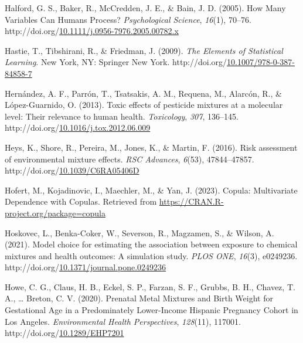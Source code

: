 \documentclass[12pt, twoside]{amherstthesis}
\newenvironment{CSLReferences}[2]%
  {}%
  {\par}
\begin{document}
\begin{CSLReferences}{1}{0}
\leavevmode{}%
Halford, G. S., Baker, R., McCredden, J. E., \& Bain, J. D. (2005). How {Many} {Variables} {Can} {Humans} {Process}? \emph{Psychological Science}, \emph{16}(1), 70--76. http://doi.org/\href{https://doi.org/10.1111/j.0956-7976.2005.00782.x}{10.1111/j.0956-7976.2005.00782.x}

\leavevmode{}%
Hastie, T., Tibshirani, R., \& Friedman, J. (2009). \emph{The {Elements} of {Statistical} {Learning}}. New York, NY: Springer New York. http://doi.org/\href{https://doi.org/10.1007/978-0-387-84858-7}{10.1007/978-0-387-84858-7}

\leavevmode{}%
Hernández, A. F., Parrón, T., Tsatsakis, A. M., Requena, M., Alarcón, R., \& López-Guarnido, O. (2013). Toxic effects of pesticide mixtures at a molecular level: {Their} relevance to human health. \emph{Toxicology}, \emph{307}, 136--145. http://doi.org/\href{https://doi.org/10.1016/j.tox.2012.06.009}{10.1016/j.tox.2012.06.009}

\leavevmode{}%
Heys, K., Shore, R., Pereira, M., Jones, K., \& Martin, F. (2016). Risk assessment of environmental mixture effects. \emph{RSC Advances}, \emph{6}(53), 47844--47857. http://doi.org/\href{https://doi.org/10.1039/C6RA05406D}{10.1039/C6RA05406D}

\leavevmode{}%
Hofert, M., Kojadinovic, I., Maechler, M., \& Yan, J. (2023). Copula: {Multivariate} {Dependence} with {Copulas}. Retrieved from \url{https://CRAN.R-project.org/package=copula}

\leavevmode{}%
Hoskovec, L., Benka-Coker, W., Severson, R., Magzamen, S., \& Wilson, A. (2021). Model choice for estimating the association between exposure to chemical mixtures and health outcomes: {A} simulation study. \emph{PLOS ONE}, \emph{16}(3), e0249236. http://doi.org/\href{https://doi.org/10.1371/journal.pone.0249236}{10.1371/journal.pone.0249236}

\leavevmode{}%
Howe, C. G., Claus, H. B., Eckel, S. P., Farzan, S. F., Grubbs, B. H., Chavez, T. A., \ldots{} Breton, C. V. (2020). Prenatal {Metal} {Mixtures} and {Birth} {Weight} for {Gestational} {Age} in a {Predominately} {Lower}-{Income} {Hispanic} {Pregnancy} {Cohort} in {Los} {Angeles}. \emph{Environmental Health Perspectives}, \emph{128}(11), 117001. http://doi.org/\href{https://doi.org/10.1289/EHP7201}{10.1289/EHP7201}


\end{CSLReferences}
\end{document}
